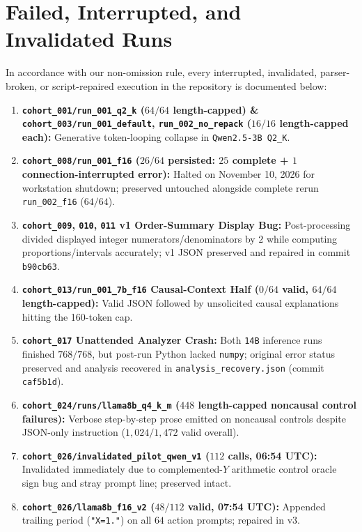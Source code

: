 \chapter{Failed, Interrupted, and Invalidated Runs}\label{app:failed_runs}
In accordance with our non-omission rule, every interrupted, invalidated, parser-broken, or script-repaired execution in the repository is documented below:
\begin{enumerate}
  \item \textbf{\texttt{cohort\_001/run\_001\_q2\_k} ($64/64$ length-capped) \& \texttt{cohort\_003/run\_001\_default}, \texttt{run\_002\_no\_repack} ($16/16$ length-capped each):} Generative token-looping collapse in \texttt{Qwen2.5-3B Q2\_K}.
  \item \textbf{\texttt{cohort\_008/run\_001\_f16} ($26/64$ persisted: $25$ complete + $1$ connection-interrupted error):} Halted on November 10, 2026 for workstation shutdown; preserved untouched alongside complete rerun \texttt{run\_002\_f16} ($64/64$).
  \item \textbf{\texttt{cohort\_009}, \texttt{010}, \texttt{011} v1 Order-Summary Display Bug:} Post-processing divided displayed integer numerators/denominators by $2$ while computing proportions/intervals accurately; v1 JSON preserved and repaired in commit \texttt{b90cb63}.
  \item \textbf{\texttt{cohort\_013/run\_001\_7b\_f16} Causal-Context Half ($0/64$ valid, $64/64$ length-capped):} Valid JSON followed by unsolicited causal explanations hitting the 160-token cap.
  \item \textbf{\texttt{cohort\_017} Unattended Analyzer Crash:} Both \texttt{14B} inference runs finished $768/768$, but post-run Python lacked \texttt{numpy}; original error status preserved and analysis recovered in \texttt{analysis\_recovery.json} (commit \texttt{caf5b1d}).
  \item \textbf{\texttt{cohort\_024/runs/llama8b\_q4\_k\_m} ($448$ length-capped noncausal control failures):} Verbose step-by-step prose emitted on noncausal controls despite JSON-only instruction ($1{,}024/1{,}472$ valid overall).
  \item \textbf{\texttt{cohort\_026/invalidated\_pilot\_qwen\_v1} ($112$ calls, 06:54 UTC):} Invalidated immediately due to complemented-$Y$ arithmetic control oracle sign bug and stray prompt line; preserved intact.
  \item \textbf{\texttt{cohort\_026/llama8b\_f16\_v2} ($48/112$ valid, 07:54 UTC):} Appended trailing period (\texttt{"X=1."}) on all $64$ action prompts; repaired in v3.

\end{enumerate}
